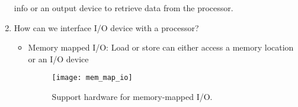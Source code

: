 \documentclass[a4paper]{article}
\begin{document}
\begin{enumerate}
			info or an output device to retrieve data from the processor.
		\item How can we interface I/O device with a processor?\\
			\begin{itemize}
				\item Memory mapped I/O: Load or store can either access a memory location
					or an I/O device
					\begin{figure}[ht!]
						\centering
						\texttt{[image: mem\_map\_io]}
						\caption{Support hardware for memory-mapped I/O.}
						\label{fig:mem_map_io}
					\end{figure}
			\end{itemize}
	\end{enumerate}
\end{document}

